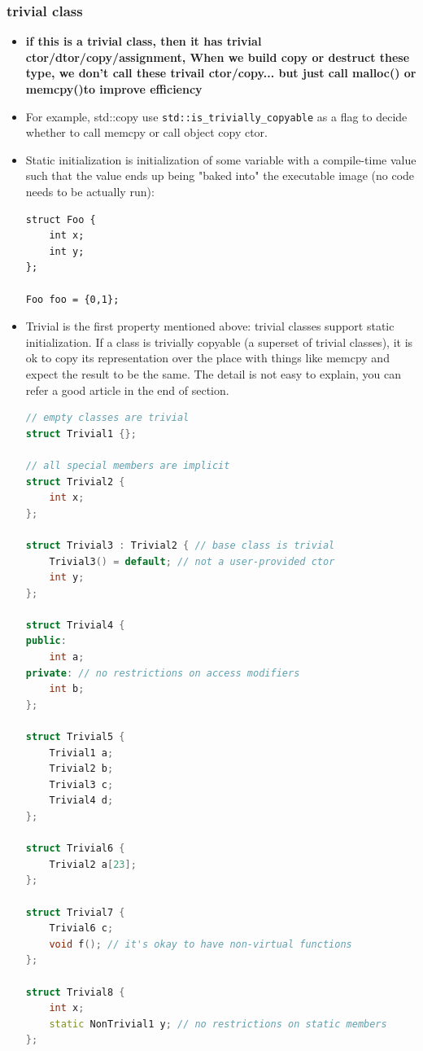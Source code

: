 \documentclass[a4paper,12pt,twoside]{book}
\begin{document}
\subsubsection{trivial class}
\begin{itemize}
\item \textbf{if this is a trivial class, then it has trivial ctor/dtor/copy/assignment, When we build copy or destruct these type, we don't call these trivail ctor/copy... but just call malloc() or memcpy()to improve efficiency}

\item For example, std::copy use \texttt{std::is\_trivially\_copyable} as a flag to decide whether to call memcpy or call object copy ctor.

\item Static initialization is initialization of some variable with a compile-time value such that the value ends up being "baked into" the executable image (no code needs to be actually run):
\begin{lstlisting}
struct Foo {
	int x;
	int y;
};

Foo foo = {0,1};
\end{lstlisting}

\item Trivial is the first property mentioned above: trivial classes support static initialization. If a class is trivially copyable (a superset of trivial classes), it is ok to copy its representation over the place with things like memcpy and expect the result to be the same. The detail is not easy to explain, you can refer a good article in the end of section. 
\begin{lstlisting}[frame=single, language=c++]
// empty classes are trivial
struct Trivial1 {};

// all special members are implicit
struct Trivial2 {
    int x;
};

struct Trivial3 : Trivial2 { // base class is trivial
    Trivial3() = default; // not a user-provided ctor
    int y;
};

struct Trivial4 {
public:
    int a;
private: // no restrictions on access modifiers
    int b;
};

struct Trivial5 {
    Trivial1 a;
    Trivial2 b;
    Trivial3 c;
    Trivial4 d;
};

struct Trivial6 {
    Trivial2 a[23];
};

struct Trivial7 {
    Trivial6 c;
    void f(); // it's okay to have non-virtual functions
};

struct Trivial8 {
    int x;
    static NonTrivial1 y; // no restrictions on static members
};


\end{lstlisting}
\end{itemize}
\end{document}
